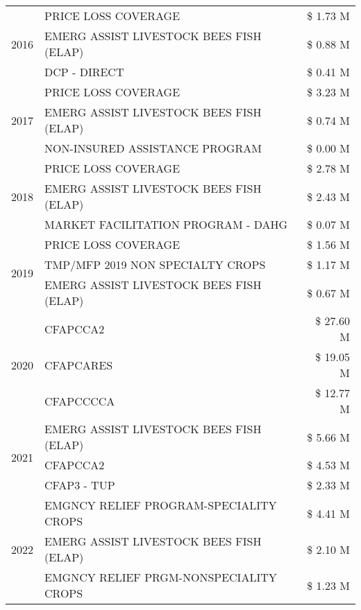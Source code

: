 \begin{tabular}{llr}
\cline{1-3}
\multirow[t]{3}{*}{2016} & PRICE LOSS COVERAGE & \$ 1.73 M \\
 & EMERG ASSIST LIVESTOCK BEES FISH (ELAP) & \$ 0.88 M \\
 & DCP - DIRECT & \$ 0.41 M \\
\cline{1-3}
\multirow[t]{3}{*}{2017} & PRICE LOSS COVERAGE & \$ 3.23 M \\
 & EMERG ASSIST LIVESTOCK BEES FISH (ELAP) & \$ 0.74 M \\
 & NON-INSURED ASSISTANCE PROGRAM & \$ 0.00 M \\
\cline{1-3}
\multirow[t]{3}{*}{2018} & PRICE LOSS COVERAGE & \$ 2.78 M \\
 & EMERG ASSIST LIVESTOCK BEES FISH (ELAP) & \$ 2.43 M \\
 & MARKET FACILITATION PROGRAM - DAHG & \$ 0.07 M \\
\cline{1-3}
\multirow[t]{3}{*}{2019} & PRICE LOSS COVERAGE & \$ 1.56 M \\
 & TMP/MFP 2019 NON SPECIALTY CROPS & \$ 1.17 M \\
 & EMERG ASSIST LIVESTOCK BEES FISH (ELAP) & \$ 0.67 M \\
\cline{1-3}
\multirow[t]{3}{*}{2020} & CFAPCCA2 & \$ 27.60 M \\
 & CFAPCARES & \$ 19.05 M \\
 & CFAPCCCCA & \$ 12.77 M \\
\cline{1-3}
\multirow[t]{3}{*}{2021} & EMERG ASSIST LIVESTOCK BEES FISH (ELAP) & \$ 5.66 M \\
 & CFAPCCA2 & \$ 4.53 M \\
 & CFAP3 - TUP & \$ 2.33 M \\
\cline{1-3}
\multirow[t]{3}{*}{2022} & EMGNCY RELIEF PROGRAM-SPECIALITY CROPS & \$ 4.41 M \\
 & EMERG ASSIST LIVESTOCK BEES FISH (ELAP) & \$ 2.10 M \\
 & EMGNCY RELIEF PRGM-NONSPECIALITY CROPS & \$ 1.23 M \\
\cline{1-3}
\bottomrule
\end{tabular}
